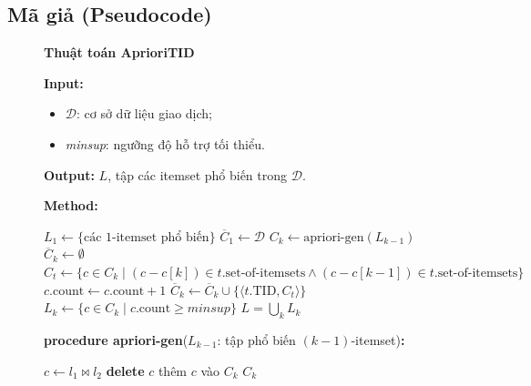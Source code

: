 \subsection{Mã giả (Pseudocode)}
\begin{figure}[!ht]
\centering
\begin{minipage}{\linewidth}
\noindent\textbf{Thuật toán AprioriTID}

\noindent\textbf{Input:}
\begin{itemize}[nosep,leftmargin=2em,topsep=2pt]
    \item $\mathcal{D}$: cơ sở dữ liệu giao dịch;
    \item \textit{minsup}: ngưỡng độ hỗ trợ tối thiểu.
\end{itemize}
\noindent\textbf{Output:} $L$, tập các itemset phổ biến trong $\mathcal{D}$.

\noindent\textbf{Method:}
\begin{algorithmic}[1]
\State $L_1 \gets \{\text{các 1-itemset phổ biến}\}$
\State $\overline{C}_1 \gets \mathcal{D}$
    \State $C_k \gets \text{apriori-gen}(L_{k-1})$ 
    \State $\overline{C}_k \gets \emptyset$
        \State $C_t \gets \{c \in C_k \mid (c - c[k]) \in t.\text{set-of-itemsets} \land (c - c[k-1]) \in t.\text{set-of-itemsets}\}$
            \State $c.\text{count} \gets c.\text{count} + 1$
        \EndFor
            \State $\overline{C}_k \gets \overline{C}_k \cup \{\langle t.\text{TID}, C_t \rangle\}$
        \EndIf
    \EndFor
    \State $L_k \gets \{c \in C_k \mid c.\text{count} \geq \textit{minsup}\}$
\EndFor
\State \Return $L = \bigcup_k L_k$
\end{algorithmic}

\vspace{0.6em}
\noindent\textbf{procedure apriori-gen}($L_{k-1}$: tập phổ biến $(k{-}1)$-itemset)\textbf{:}
\begin{algorithmic}[1]
            \State $c \gets l_1 \bowtie l_2$ 
                \State \textbf{delete} $c$ 
            \Else
                \State thêm $c$ vào $C_k$
            \EndIf
        \EndIf
    \EndFor
\EndFor
\State \Return $C_k$
\end{algorithmic}


\end{minipage}
\end{figure}
